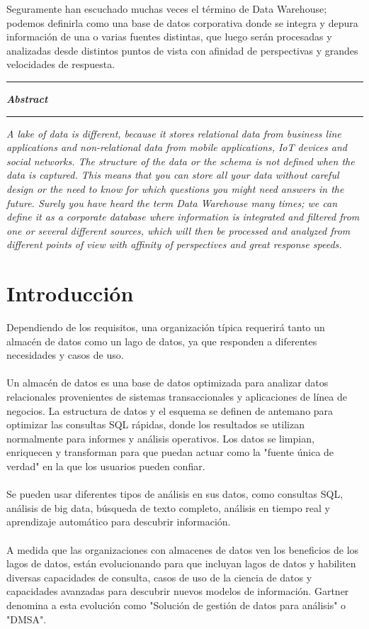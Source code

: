 \documentclass[11pt,a4paper]{article}
\begin{document}
Seguramente han escuchado muchas veces el término de Data Warehouse; podemos definirla como una base de datos corporativa donde se integra y depura información de una o varias fuentes distintas, que luego serán procesadas y analizadas desde distintos puntos de vista con afinidad de perspectivas y grandes velocidades de respuesta.

	\rule{155mm}{0.1mm}	

	\vspace{\baselineskip}

	\textbf{\textit{\large Abstract}}\rule[1.5mm]{5mm}{0.1mm} 		
	\textit{
		A lake of data is different, because it stores relational data from business line applications and non-relational data from mobile applications, IoT devices and social networks. The structure of the data or the schema is not defined when the data is captured. This means that you can store all your data without careful design or the need to know for which questions you might need answers in the future. 
Surely you have heard the term Data Warehouse many times; we can define it as a corporate database where information is integrated and filtered from one or several different sources, which will then be processed and analyzed from different points of view with affinity of perspectives and great response speeds.
	}
			
	
	\vspace{\baselineskip}
	
	\section{Introducción}
	
	Dependiendo de los requisitos, una organización típica requerirá tanto un almacén de datos como un lago de datos, ya que responden a diferentes necesidades y casos de uso.\\
		\\
		Un almacén de datos es una base de datos optimizada para analizar datos relacionales provenientes de sistemas transaccionales y aplicaciones de línea de negocios. La estructura de datos y el esquema se definen de antemano para optimizar las consultas SQL rápidas, donde los resultados se utilizan normalmente para informes y análisis operativos. Los datos se limpian, enriquecen y transforman para que puedan actuar como la "fuente única de verdad" en la que los usuarios pueden confiar.\\
		\\
		 Se pueden usar diferentes tipos de análisis en sus datos, como consultas SQL, análisis de big data, búsqueda de texto completo, análisis en tiempo real y aprendizaje automático para descubrir información.\\
		\\
		A medida que las organizaciones con almacenes de datos ven los beneficios de los lagos de datos, están evolucionando para que incluyan lagos de datos y habiliten diversas capacidades de consulta, casos de uso de la ciencia de datos y capacidades avanzadas para descubrir nuevos modelos de información. Gartner denomina a esta evolución como "Solución de gestión de datos para análisis" o "DMSA".
	
\end{document}
